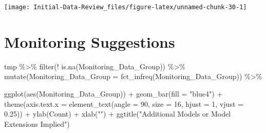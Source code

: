 \documentclass[
]{article}
\newenvironment{Shaded}{\begin{snugshade}}{\end{snugshade}}
\newcommand{\AttributeTok}[1]{\textcolor[rgb]{0.77,0.63,0.00}{#1}}
\newcommand{\CommentTok}[1]{\textcolor[rgb]{0.56,0.35,0.01}{\textit{#1}}}
\newcommand{\ConstantTok}[1]{\textcolor[rgb]{0.00,0.00,0.00}{#1}}
\newcommand{\DecValTok}[1]{\textcolor[rgb]{0.00,0.00,0.81}{#1}}
\newcommand{\FloatTok}[1]{\textcolor[rgb]{0.00,0.00,0.81}{#1}}
\newcommand{\FunctionTok}[1]{\textcolor[rgb]{0.00,0.00,0.00}{#1}}
\newcommand{\NormalTok}[1]{#1}
\newcommand{\OtherTok}[1]{\textcolor[rgb]{0.56,0.35,0.01}{#1}}
\newcommand{\SpecialCharTok}[1]{\textcolor[rgb]{0.00,0.00,0.00}{#1}}
\newcommand{\StringTok}[1]{\textcolor[rgb]{0.31,0.60,0.02}{#1}}
\begin{document}
\begin{center}\texttt{[image: Initial-Data-Review\_files/figure-latex/unnamed-chunk-30-1]} \end{center}

\hypertarget{monitoring-suggestions}{%
\section{Monitoring Suggestions}\label{monitoring-suggestions}}

\begin{Shaded}
\end{Shaded}

\begin{Shaded}
\begin{Highlighting}[]
\NormalTok{tmp }\SpecialCharTok{\%\textgreater{}\%}
  \FunctionTok{filter}\NormalTok{(}\SpecialCharTok{!} \FunctionTok{is.na}\NormalTok{(Monitoring\_Data\_Group))  }\SpecialCharTok{\%\textgreater{}\%}
  \FunctionTok{mutate}\NormalTok{(}\AttributeTok{Monitoring\_Data\_Group =} \FunctionTok{fct\_infreq}\NormalTok{(Monitoring\_Data\_Group)) }\SpecialCharTok{\%\textgreater{}\%}
   
  \FunctionTok{ggplot}\NormalTok{(}\FunctionTok{aes}\NormalTok{(Monitoring\_Data\_Group)) }\SpecialCharTok{+}
  \FunctionTok{geom\_bar}\NormalTok{(}\AttributeTok{fill =} \StringTok{"blue4"}\NormalTok{) }\SpecialCharTok{+}
  \FunctionTok{theme}\NormalTok{(}\AttributeTok{axis.text.x =} \FunctionTok{element\_text}\NormalTok{(}\AttributeTok{angle =} \DecValTok{90}\NormalTok{, }\AttributeTok{size =} \DecValTok{16}\NormalTok{,}
                                   \AttributeTok{hjust =} \DecValTok{1}\NormalTok{, }\AttributeTok{vjust =} \FloatTok{0.25}\NormalTok{)) }\SpecialCharTok{+}
  \FunctionTok{ylab}\NormalTok{(}\StringTok{\textquotesingle{}Count\textquotesingle{}}\NormalTok{) }\SpecialCharTok{+}
  \FunctionTok{xlab}\NormalTok{(}\StringTok{""}\NormalTok{) }\SpecialCharTok{+}
  \FunctionTok{ggtitle}\NormalTok{(}\StringTok{"Additional Models or Model Extensions Implied"}\NormalTok{)}
\end{Highlighting}
\end{Shaded}
\end{document}
